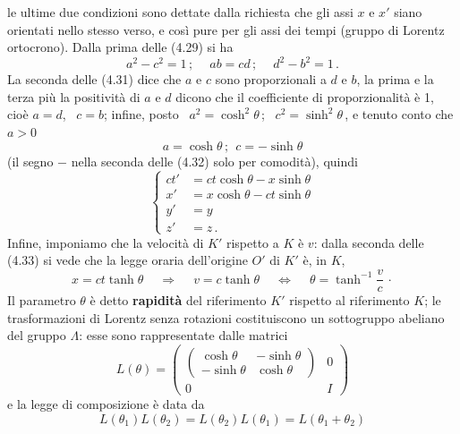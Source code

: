 le ultime due condizioni sono dettate dalla richiesta che gli assi $x$ e $x'$
siano orientati nello stesso verso, e cos\`i pure per gli assi dei tempi (gruppo
di Lorentz ortocrono). Dalla prima delle (4.29) si ha
\begin{equation}
  a^2-c^2=1\,;\quad\ ab=cd\,;\quad\ d^2-b^2=1\,.
  \tag{4.31}
\end{equation}
La seconda delle (4.31) dice che $a$ e $c$ sono proporzionali a $d$ e $b$, la
prima e la terza pi\`u la positivit\`a di $a$ e $d$ dicono che il coefficiente
di proporzionalit\`a \`e 1, cio\`e $a=d$, \ $c=b$; infine, posto
\ $a^2=\cosh^2\theta$\,; \ $c^2=\sinh^2\theta$\,, e tenuto conto che $a>0$
\begin{equation}
  a=\cosh\theta\,;\ \ c=-\sinh\theta
  \tag{4.32}
\end{equation}
(il segno $-$ nella seconda delle (4.32) solo per comodit\`a), quindi
\begin{equation}
  \left\{\begin{aligned}
    ct'&=ct\cosh\theta-x\sinh\theta\\
    x'&=x\cosh\theta-ct\sinh\theta\\
    y'&=y\\
    z'&=z\,.
  \end{aligned}\right.
  \tag{4.33}
\end{equation}
Infine, imponiamo che la velocit\`a di $K'$ rispetto a $K$ \`e $v$: dalla
seconda delle (4.33) si vede che la legge oraria dell'origine $O'$ di $K'$ \`e,
in $K$,
\begin{equation}
  x=ct\tanh\theta\quad\ \Rightarrow\quad\ v=c\tanh\theta
  \quad\ \Leftrightarrow\quad\ \theta=\tanh^{-1}\frac vc\,\cdot
  \tag{4.34}
\end{equation}
Il parametro $\theta$ \`e detto \textbf{rapidit\`a} del riferimento $K'$
rispetto al riferimento $K$; le trasformazioni di Lorentz senza rotazioni
costituiscono un sottogruppo abeliano del gruppo $\Lambda$: esse sono
rappresentate dalle matrici
\begin{equation}
  L(\theta)=\begin{pmatrix}\begin{pmatrix}\cosh\theta&-\sinh\theta\\-\sinh\theta
  &\cosh\theta\end{pmatrix}&0\\0&I\end{pmatrix}
  \tag{4.35}
\end{equation}
e la legge di composizione \`e data da
\begin{equation}
  L(\theta_1)L(\theta_2)=L(\theta_2)L(\theta_1)=L(\theta_1+\theta_2)
  \tag{4.36}
\end{equation}
